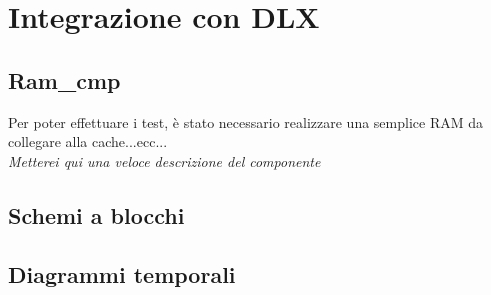 \clearpage{\pagestyle{empty}\cleardoublepage}
\chapter{Integrazione con DLX}


\section{Ram\_cmp}

Per poter effettuare i test, \`e stato necessario realizzare una semplice RAM da collegare alla cache...ecc...\\

\emph{Metterei qui una veloce descrizione del componente}

\section{Schemi a blocchi}

\section{Diagrammi temporali}
